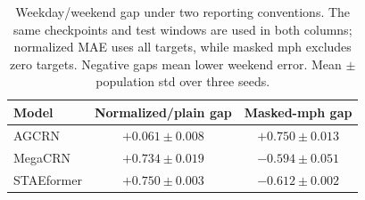 \begin{table}[h]
\centering
\small
\caption{Weekday/weekend gap under two reporting conventions. The same
checkpoints and test windows are used in both columns; normalized MAE uses
all targets, while masked mph excludes zero targets. Negative gaps mean
lower weekend error. Mean $\pm$ population std over three seeds.}
\label{tab:temporal_absolute}
\begin{tabular}{lcc}
\toprule
\textbf{Model} & \textbf{Normalized/plain gap} & \textbf{Masked-mph gap} \\
\midrule
AGCRN & $+0.061\pm0.008$ & $+0.750\pm0.013$ \\
MegaCRN & $+0.734\pm0.019$ & $-0.594\pm0.051$ \\
STAEformer & $+0.750\pm0.003$ & $-0.612\pm0.002$ \\
\bottomrule
\end{tabular}
\end{table}
